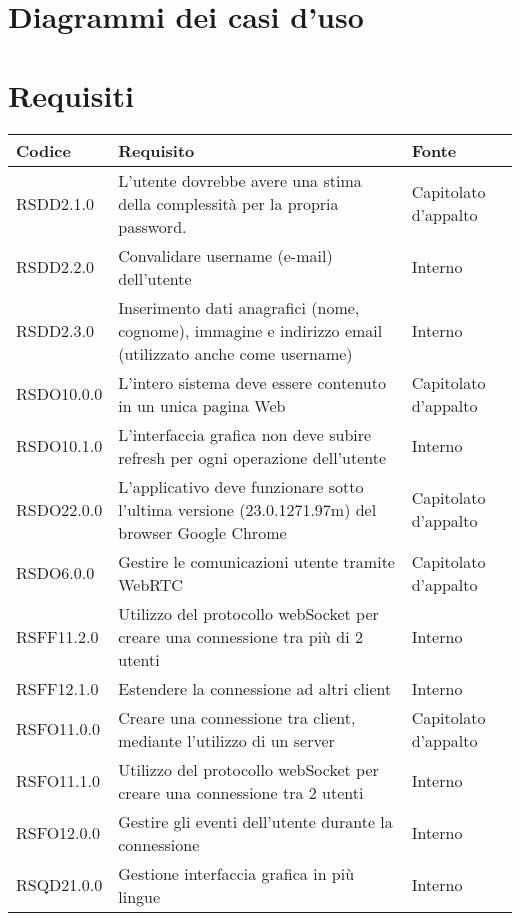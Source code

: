 \section{Diagrammi dei casi d'uso}

\section{Requisiti}

\begin{longtable}{lp{}l}
\toprule Codice & Requisito & Fonte\\
\midrule
RSDD2.1.0 & L'utente dovrebbe avere una stima della complessità per la propria password. & Capitolato d'appalto \\
RSDD2.2.0 & Convalidare username (e-mail) dell'utente & Interno \\
RSDD2.3.0 & Inserimento dati anagrafici (nome, cognome), immagine e indirizzo email (utilizzato anche come username) & Interno \\
RSDO10.0.0 & L'intero sistema deve essere contenuto in un unica pagina Web & Capitolato d'appalto \\
RSDO10.1.0 & L'interfaccia grafica non deve subire refresh per ogni operazione dell'utente & Interno \\
RSDO22.0.0 & L'applicativo deve funzionare sotto l'ultima versione (23.0.1271.97m) del browser Google Chrome & Capitolato d'appalto \\
RSDO6.0.0 & Gestire le comunicazioni utente tramite WebRTC & Capitolato d'appalto \\
RSFF11.2.0 & Utilizzo del protocollo webSocket per creare una connessione tra più di 2 utenti & Interno \\
RSFF12.1.0 & Estendere la connessione ad altri client & Interno \\
RSFO11.0.0 & Creare una connessione tra client, mediante l'utilizzo di un server & Capitolato d'appalto \\
RSFO11.1.0 & Utilizzo del protocollo webSocket per creare una connessione tra 2 utenti & Interno \\
RSFO12.0.0 & Gestire gli eventi dell'utente durante la connessione & Interno \\
RSQD21.0.0 & Gestione interfaccia grafica in più lingue & Interno \\

\end{longtable}
